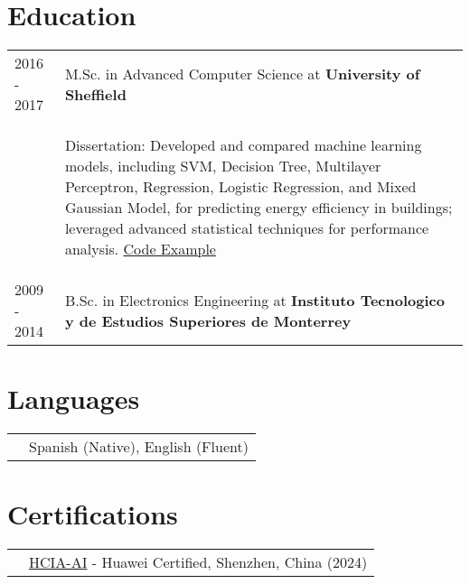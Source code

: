 \documentclass[a4paper,12pt]{article}
\begin{document}
\section{Education}
\begin{tabularx}{\linewidth}{@{}l X@{}}	
    2016 - 2017 & M.Sc. in Advanced Computer Science at \textbf{University of Sheffield} \hfill \\
    & \begin{itemize}[nosep, leftmargin=*]
        Dissertation: Developed and compared machine learning models, including SVM, Decision Tree, Multilayer Perceptron, Regression, Logistic Regression, and Mixed Gaussian Model, for predicting energy efficiency in buildings; leveraged advanced statistical techniques for performance analysis. \href{https://github.com/dcerdac/DissertationCode}{Code Example}
    \end{itemize} \\
    2009 - 2014 & B.Sc. in Electronics Engineering at \textbf{Instituto Tecnologico y de Estudios Superiores de Monterrey} \hfill \\ 
    \end{tabularx}

\section{Languages}
\begin{tabularx}{\linewidth}{@{}l X@{}}
& \normalsize{Spanish (Native), English (Fluent)}\\
\end{tabularx}

\section{Certifications}

\begin{tabularx}{\linewidth}{@{}l X@{}}
& \normalsize{\href{https://github.com/dcerdac/MachineLearningProjects/blob/master/010102001521809623012377209.pdf}{HCIA-AI} - Huawei Certified, Shenzhen, China (2024)}\\
\end{tabularx}
\end{document}
